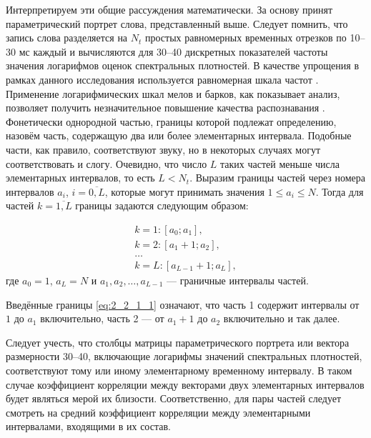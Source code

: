 Интерпретируем эти общие рассуждения математически.
За основу принят параметрический портрет слова, представленный выше.
Следует помнить, что запись слова разделяется на $N_t$ простых равномерных временных отрезков по 10--30 мс каждый и вычисляются для 30--40 дискретных показателей частоты значения логарифмов оценок спектральных плотностей.
В качестве упрощения в рамках данного исследования используется равномерная шкала частот \cite{korsun2014algo, kolokolov2015compare}.
Применение логарифмических шкал мелов и барков, как показывает анализ, позволяет получить незначительное повышение качества распознавания \cite{korsun2014algo, kolokolov2015compare}.
Фонетически однородной частью, границы которой подлежат определению, назовём часть, содержащую два или более элементарных интервала.
Подобные части, как правило, соответствуют звуку, но в некоторых случаях могут соответствовать и слогу.
Очевидно, что число $L$ таких частей меньше числа элементарных интервалов, то есть $L < N_t$.
Выразим границы частей через номера интервалов $a_i$, $i = \overline{0, L}$, которые могут принимать значения $1 \le a_i \le N$.
Тогда для частей $k = \overline{1, L}$ границы задаются следующим образом:

\begin{equation} \label{eq:2_2_1_1}
\begin{gathered}
k = 1 : [a_0; a_1], \\
k = 2 : [a_1 + 1; a_2], \\
\dots \\
k = L : [a_{L-1} + 1; a_L],
\end{gathered}
\end{equation}
где $a_0 = 1$, $a_L = N$ и $a_1, a_2, \dots, a_{L-1}$ --- граничные интервалы частей.

Введённые границы \eqref{eq:2_2_1_1} означают, что часть 1 содержит интервалы от $1$ до $a_1$ включительно, часть 2 --- от $a_1 + 1$ до $a_2$ включительно и так далее.

Следует учесть, что столбцы матрицы параметрического портрета или вектора размерности 30--40, включающие логарифмы значений спектральных плотностей, соответствуют тому или иному элементарному временному интервалу.
В таком случае коэффициент корреляции между векторами двух элементарных интервалов будет являться мерой их близости.
Соответственно, для пары частей следует смотреть на средний коэффициент корреляции между элементарными интервалами, входящими в их состав.

